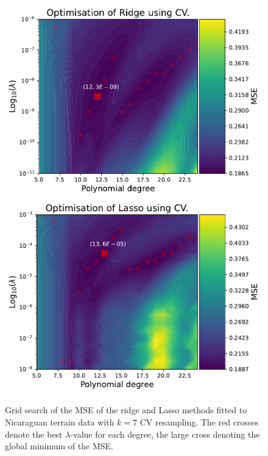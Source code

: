 \documentclass[twocolumn,english,notitlepage]{article}
\begin{document}
        \begin{figure} [ht]
            \centering
            \includegraphics[width=\linewidth]{HM_Nica_Ridge_heatmap.pdf}
            \includegraphics[width=\linewidth]{HM_Nica_Lasso_heatmap.pdf}
            \caption{Grid search of the MSE of the ridge and Lasso methods fitted to Nicaraguan terrain data with $k=7$ CV resampling. The red crosses denote the best $\lambda$-value for each degree, the large cross denoting the global minimum of the MSE.}
            \label{res:fig:Nica_heatmap}
        \end{figure}
\end{document}
